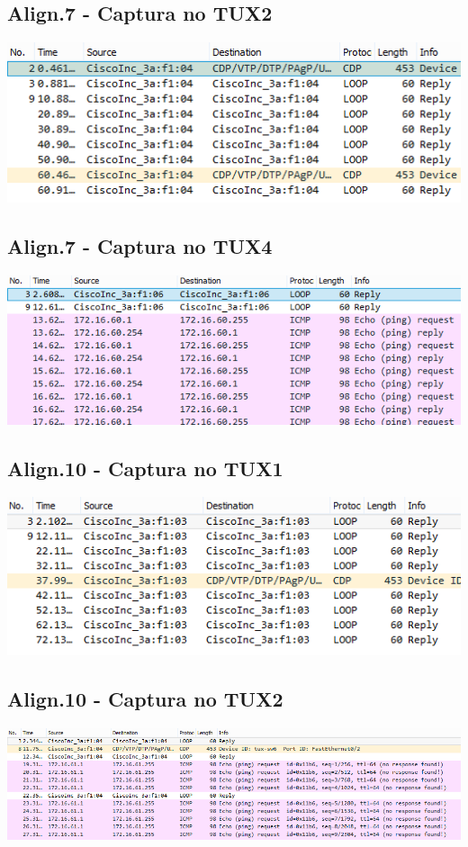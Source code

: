 \documentclass[11pt,a4paper,reqno]{report}
\numberwithin{equation}{section}
\begin{document}
\begin{appendices}
\subsection{Align.7 - Captura no TUX2}
\label{ex2_tux1ping_tux2}
\includegraphics[width=18cm]{ex2_a7_tux2.png}
\subsection{Align.7 - Captura no TUX4}
\label{ex2_tux1ping_tux4}
\includegraphics[width=18cm]{ex2_a7_tux4.png}

\subsection{Align.10 - Captura no TUX1}
\includegraphics[width=18cm]{ex2_a10_tux1.png}
\subsection{Align.10 - Captura no TUX2}
\includegraphics[width=18cm]{ex2_a10_tux2.png}

\end{appendices}
\end{document}
